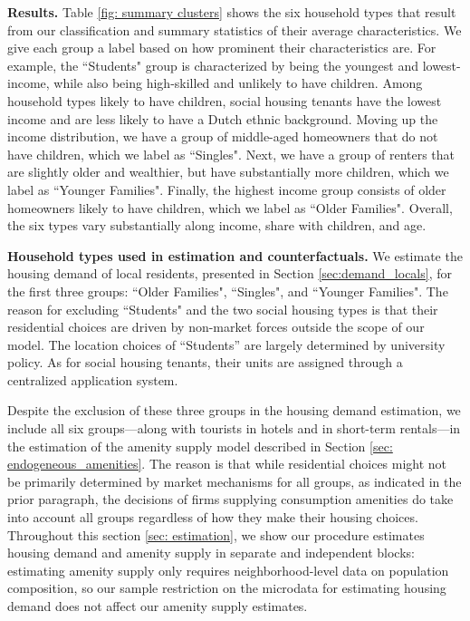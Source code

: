 \documentclass[11pt]{article}
\newcommand{\Paragraph}{\vspace{0.1cm}\noindent\textbf}
\begin{document}
\Paragraph{Results.} Table \ref{fig: summary clusters} shows the six household types that result from our classification and summary statistics of their average characteristics. We give each group a label based on how prominent their characteristics are. For example, the ``Students" group is characterized by being the youngest and lowest-income, while also being high-skilled and unlikely to have children. Among household types likely to have children, social housing tenants have the lowest income and are less likely to have a Dutch ethnic background. Moving up the income distribution, we have a group of middle-aged homeowners that do not have children, which we label as ``Singles". Next, we have a group of renters that are slightly older and wealthier, but have substantially more children, which we label as ``Younger Families". Finally, the highest income group consists of older homeowners likely to have children, which we label as ``Older Families". Overall, the six types vary substantially along income, share with children, and age.

\Paragraph{Household types used in estimation and counterfactuals.} We estimate the housing demand of local residents, presented in Section \ref{sec:demand_locals}, for the first three groups: ``Older Families", ``Singles", and ``Younger Families". The reason for excluding ``Students" and the two social housing types is that their residential choices are driven by non-market forces outside the scope of our model. The location choices of ``Students'' are largely determined by university policy. As for social housing tenants, their units are assigned through a centralized application system. 

Despite the exclusion of these three groups in the housing demand estimation, we include all six groups---along with tourists in hotels and in short-term rentals---in the estimation of the amenity supply model described in Section \ref{sec: endogeneous_amenities}. The reason is that while residential choices might not be primarily determined by market mechanisms for all groups, as indicated in the prior paragraph, the decisions of firms supplying consumption amenities do take into account all groups regardless of how they make their housing choices. Throughout this section \ref{sec: estimation}, we show our procedure estimates housing demand and amenity supply in separate and independent blocks: estimating amenity supply only requires neighborhood-level data on population composition, so our sample restriction on the microdata for estimating housing demand does not affect our amenity supply estimates. 
\end{document}
